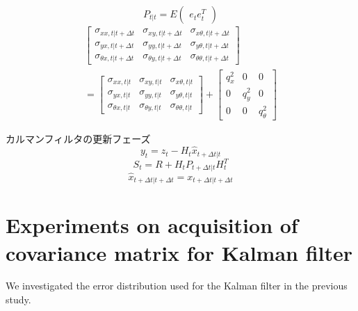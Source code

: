 \documentclass[a4paper]{article}
\begin{document}
\begin{equation}
    P_{t|t} = E
    \begin{pmatrix}
        e_{t} e_{t}^{T}
    \end{pmatrix}
    \label{eq:5}
\end{equation}
%
%
\begin{equation}
    \begin{split}
    \begin{bmatrix}
    \sigma_{xx,t|t+\Delta t} &\sigma_{xy,t|t+\Delta t} &\sigma_{x\theta,t|t+\Delta t} \\
    \sigma_{yx,t|t+\Delta t} &\sigma_{yy,t|t+\Delta t} &\sigma_{y\theta,t|t+\Delta t} \\
    \sigma_{\theta x,t|t+\Delta t} &\sigma_{\theta y,t|t+\Delta t} &\sigma_{\theta\theta,t|t+\Delta t} 
    \end{bmatrix} \\
    = 
    \begin{bmatrix}
        \sigma_{xx,t|t} &\sigma_{xy,t|t} &\sigma_{x\theta,t|t} \\
        \sigma_{yx,t|t} &\sigma_{yy,t|t} &\sigma_{y\theta,t|t} \\
        \sigma_{\theta x,t|t} &\sigma_{\theta y,t|t} &\sigma_{\theta\theta,t|t}
    \end{bmatrix} 
    +
    \begin{bmatrix}
        q_{x}^{2} &0         &0 \\
        0         &q_{y}^{2} &0 \\
        0         &0         &q_{\theta}^{2}
    \end{bmatrix}
\end{split}
    \label{eq:6} 
\end{equation}

カルマンフィルタの更新フェーズ
\begin{equation}
    y_{t} = z_{t} - H_{t}\hat{x}_{t+\Delta t|t}
    \label{eq:7}
\end{equation}
%
%
\begin{equation}
    S_{t} = R + H_{t}P_{t+\Delta t|t}H_{t}^{T}
    \label{eq:8}
\end{equation}
%
%
\begin{equation}
    \hat{x}_{t+\Delta t|t+\Delta t} = x_{t+\Delta t|t+\Delta t}
    \label{eq:9}
\end{equation}


\section{Experiments on acquisition of covariance matrix for Kalman filter}
We investigated the error distribution used for the Kalman filter in the previous study.
\end{document}
